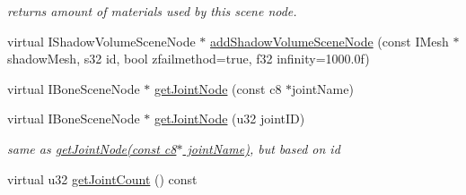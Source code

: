 \begin{DoxyCompactItemize}
\begin{DoxyCompactList}\small\item\em returns amount of materials used by this scene node. \end{DoxyCompactList}\item 
virtual I\-Shadow\-Volume\-Scene\-Node $\ast$ \hyperlink{classirr_1_1scene_1_1_c_animated_mesh_scene_node_a662a23f9e9e25be16835fbaea2e93d66}{add\-Shadow\-Volume\-Scene\-Node} (const I\-Mesh $\ast$shadow\-Mesh, s32 id, bool zfailmethod=true, f32 infinity=1000.\-0f)
\item 
virtual I\-Bone\-Scene\-Node $\ast$ \hyperlink{classirr_1_1scene_1_1_c_animated_mesh_scene_node_a240c097183bf4593766859e0a114f930}{get\-Joint\-Node} (const c8 $\ast$joint\-Name)
\item 
virtual I\-Bone\-Scene\-Node $\ast$ \hyperlink{classirr_1_1scene_1_1_c_animated_mesh_scene_node_add6d7d67a2ee09fd9da01a0077d1550f}{get\-Joint\-Node} (u32 joint\-I\-D)
\begin{DoxyCompactList}\small\item\em same as \hyperlink{classirr_1_1scene_1_1_c_animated_mesh_scene_node_a240c097183bf4593766859e0a114f930}{get\-Joint\-Node(const c8$\ast$ joint\-Name)}, but based on id \end{DoxyCompactList}\item 
\hypertarget{classirr_1_1scene_1_1_c_animated_mesh_scene_node_a553c398db17d14a6a781d2b859c137d7}{virtual u32 \hyperlink{classirr_1_1scene_1_1_c_animated_mesh_scene_node_a553c398db17d14a6a781d2b859c137d7}{get\-Joint\-Count} () const }\label{classirr_1_1scene_1_1_c_animated_mesh_scene_node_a553c398db17d14a6a781d2b859c137d7}


\end{DoxyCompactItemize}
